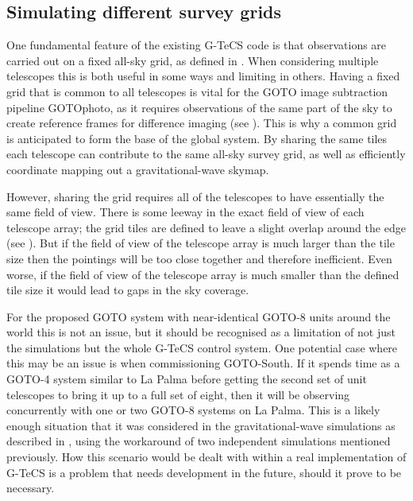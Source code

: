 \subsection{Simulating different survey grids}
\label{sec:multi_grid_scheduling}
\begin{colsection}

One fundamental feature of the existing G-TeCS code is that observations are carried out on a fixed all-sky grid, as defined in . When considering multiple telescopes this is both useful in some ways and limiting in others. Having a fixed grid that is common to all telescopes is vital for the GOTO image subtraction pipeline GOTOphoto, as it requires observations of the same part of the sky to create reference frames for difference imaging (see ). This is why a common grid is anticipated to form the base of the global system. By sharing the same tiles each telescope can contribute to the same all-sky survey grid, as well as efficiently coordinate mapping out a gravitational-wave skymap.

\newpage

However, sharing the grid requires all of the telescopes to have essentially the same field of view. There is some leeway in the exact field of view of each telescope array; the grid tiles are defined to leave a slight overlap around the edge (see ). But if the field of view of the telescope array is much larger than the tile size then the pointings will be too close together and therefore inefficient. Even worse, if the field of view of the telescope array is much smaller than the defined tile size it would lead to gaps in the sky coverage.

For the proposed GOTO system with near-identical GOTO-8 units around the world this is not an issue, but it should be recognised as a limitation of not just the simulations but the whole G-TeCS control system. One potential case where this may be an issue is when commissioning GOTO-South. If it spends time as a GOTO-4 system similar to La Palma before getting the second set of unit telescopes to bring it up to a full set of eight, then it will be observing concurrently with one or two GOTO-8 systems on La Palma. This is a likely enough situation that it was considered in the gravitational-wave simulations as described in , using the workaround of two independent simulations mentioned previously. How this scenario would be dealt with within a real implementation of G-TeCS is a problem that needs development in the future, should it prove to be necessary.

\end{colsection}

